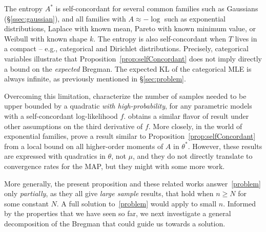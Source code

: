\documentclass[twoside]{article}
\newcommand{\logpart}{A}
\newcommand{\conj}{{\logpart^*}}
\newcommand{\nat}{\theta}
\newcommand{\m}{\mu}
\begin{document}
The entropy $\conj$ is self-concordant for several common families such as Gaussians (\S\ref{ssec:gaussian}), and all families with $\logpart \approx -\log$ such as
exponential distributions,
Laplace with known mean,
Pareto with known minimum value,
or Weibull with known shape $k$.
The entropy is also self-concordant when $T$ lives in a compact \citep{bubeck2015entropic} -- e.g., categorical and Dirichlet distributions.
Precisely, categorical variables illustrate that Proposition~\ref{prop:selfConcordant} does not imply directly a bound on the \emph{expected} Bregman.
The expected KL of the categorical MLE is always infinite, as previously mentioned in \S\ref{sec:problem}.

Overcoming this limitation,
\citet{ostrovskii2021finite} characterize the number of samples needed to be upper bounded by a quadratic \emph{with high-probability}, for any parametric models with a self-concordant log-likelihood $f$.
\citet{anastasiou2017bounds} obtains a similar flavor of result under other assumptions on the third derivative of $f$.
More closely, in the world of exponential families, \citet{kakade2010learning} prove a result similar to Proposition~\ref{prop:selfConcordant} from a local bound on all higher-order moments of $\logpart$ in $\nat^*$.
However, these results are expressed with quadratics in $\nat$, not $\m$, and they do not directly translate to convergence rates for the MAP, but they might with some more work.

More generally, the present proposition and these related works answer~\eqref{problem} only \emph{partially}, as they all give \textit{large sample} results, that hold when $n\geq N$ for some constant $N$. 
A full solution to~\eqref{problem} would apply to small $n$.
Informed by the properties that we have seen so far, we next investigate a general decomposition of the Bregman that could guide us towards a solution.
\end{document}
